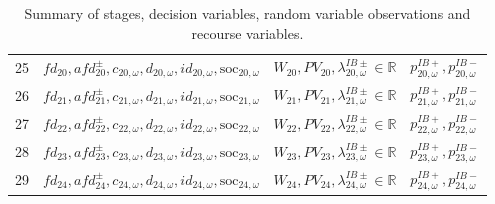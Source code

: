 \documentclass{article}
\newcommand{\R}{\mathbb{R}}
\newcommand{\soc}{\text{soc}}
\begin{document}
\begin{table}
\begin{tabular}{c c c c}
	25 & $fd_{20}, afd^{\pm}_{20}, c_{20, \omega}, d_{20, \omega}, id_{20, \omega}, \soc_{20, \omega}$  & $W_{20}, PV_{20}, \lambda^{IB\pm}_{20, \omega} \in \R$ & $p^{IB+}_{20, \omega}, p^{IB-}_{20, \omega}$ \\
	26 &  $fd_{21}, afd^{\pm}_{21}, c_{21, \omega}, d_{21, \omega}, id_{21, \omega}, \soc_{21, \omega}$ & $W_{21}, PV_{21}, \lambda^{IB\pm}_{21, \omega} \in \R$ & $p^{IB+}_{21, \omega}, p^{IB-}_{21, \omega}$ \\
	27 & $fd_{22}, afd^{\pm}_{22}, c_{22, \omega}, d_{22, \omega}, id_{22, \omega}, \soc_{22, \omega}$ & $W_{22}, PV_{22}, \lambda^{IB\pm}_{22, \omega} \in \R$ & $p^{IB+}_{22, \omega}, p^{IB-}_{22, \omega}$ \\
	28 & $fd_{23}, afd^{\pm}_{23}, c_{23, \omega}, d_{23, \omega}, id_{23, \omega}, \soc_{23, \omega}$ & $W_{23}, PV_{23}, \lambda^{IB\pm}_{23, \omega} \in \R$ & $p^{IB+}_{23, \omega}, p^{IB-}_{23, \omega}$ \\
	29 & $fd_{24}, afd^{\pm}_{24}, c_{24, \omega}, d_{24, \omega}, id_{24, \omega}, \soc_{24, \omega}$ & $W_{24}, PV_{24}, \lambda^{IB\pm}_{24, \omega} \in \R$ & $p^{IB+}_{24, \omega}, p^{IB-}_{24, \omega}$ \\
	
\end{tabular}
\caption{Summary of stages, decision variables, random variable observations and recourse variables.}
\label{TABLE:stages-rv-dv}
\end{table}



\printbibliography
\end{document}
